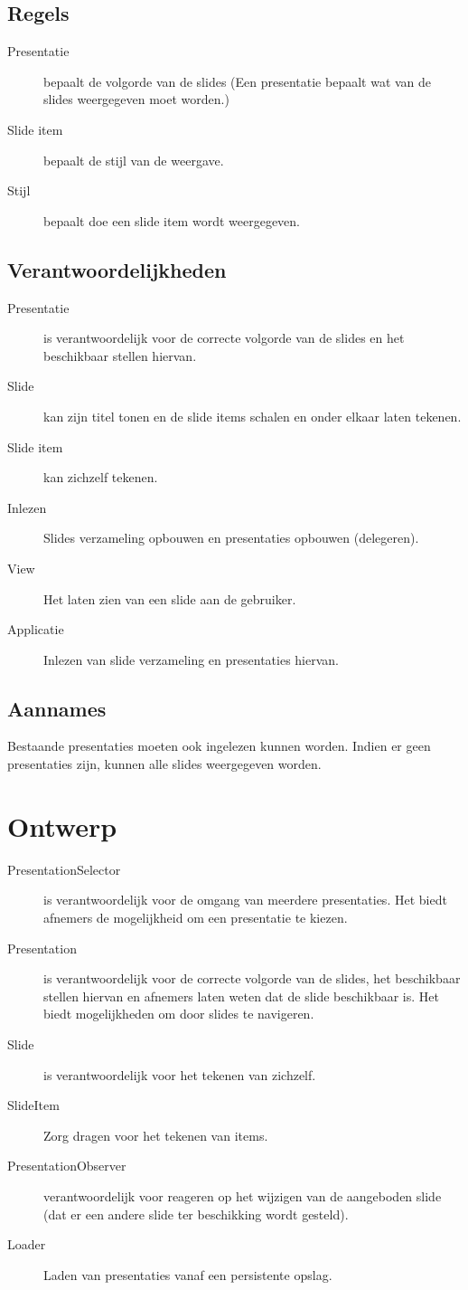 \documentclass[a4paper]{article}
\begin{document}
\subsection{Regels}
\begin{description}
\item[Presentatie] bepaalt de volgorde van de slides
(Een presentatie bepaalt wat van de slides weergegeven moet worden.)
\item[Slide item] bepaalt de stijl van de weergave.
\item[Stijl] bepaalt doe een slide item wordt weergegeven. 
\end{description}

\subsection{Verantwoordelijkheden}
\begin{description}
\item[Presentatie] is verantwoordelijk voor de correcte volgorde van de slides en het beschikbaar stellen hiervan. 
\item[Slide] kan zijn titel tonen en de slide items schalen en onder elkaar laten tekenen.
\item[Slide item] kan zichzelf tekenen.
\item[Inlezen] Slides verzameling opbouwen en presentaties opbouwen (delegeren).
\item[View] Het laten zien van een slide aan de gebruiker.
\item[Applicatie] Inlezen van slide verzameling en presentaties hiervan.
\end{description}

\subsection{Aannames}
Bestaande presentaties moeten ook ingelezen kunnen worden. Indien er geen presentaties zijn, kunnen alle slides weergegeven worden.

\section{Ontwerp}
\begin{description}
\item[PresentationSelector] is verantwoordelijk voor de omgang van meerdere presentaties. Het biedt afnemers de mogelijkheid om een presentatie te kiezen.
\item[Presentation] is verantwoordelijk voor de correcte volgorde van de slides, het beschikbaar stellen hiervan en afnemers laten weten dat de slide beschikbaar is. Het biedt mogelijkheden om door slides te navigeren.
\item[Slide] is verantwoordelijk voor het tekenen van zichzelf.
\item[SlideItem] Zorg dragen voor het tekenen van items.
\item[PresentationObserver] verantwoordelijk voor reageren op het wijzigen van de aangeboden slide (dat er een andere slide ter beschikking wordt gesteld).
\item[Loader] Laden van presentaties vanaf een persistente opslag.
\end{description}
\end{document}
